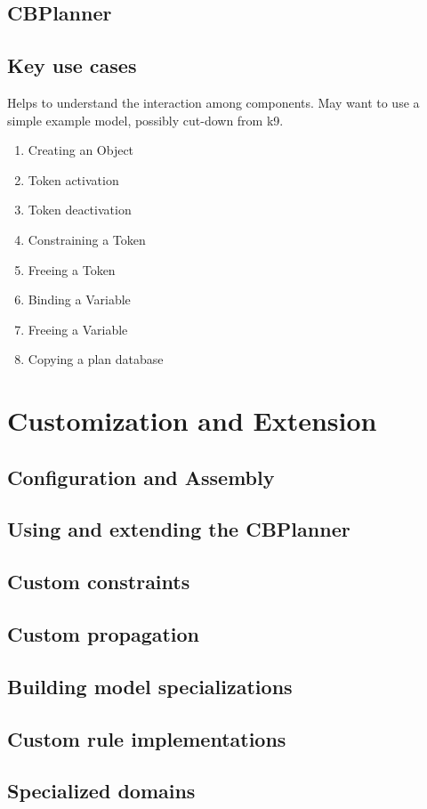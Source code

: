 \documentclass[10pt, letterpaper, twoside]{article}
\begin{document}
\subsection{CBPlanner}
\subsection{Key use cases}
Helps to understand the interaction among components. May want to use a simple example model, possibly cut-down from k9.
\begin{enumerate}
\item Creating an Object
\item Token activation
\item Token deactivation
\item Constraining a Token
\item Freeing a Token
\item Binding a Variable
\item Freeing a Variable
\item Copying a plan database
\end{enumerate}

\section{Customization and Extension}
\subsection{Configuration and Assembly}
\subsection{Using and extending the CBPlanner}
\subsection{Custom constraints}
\subsection{Custom propagation}
\subsection{Building model specializations}
\subsection{Custom rule implementations}
\subsection{Specialized domains}
\end{document}
